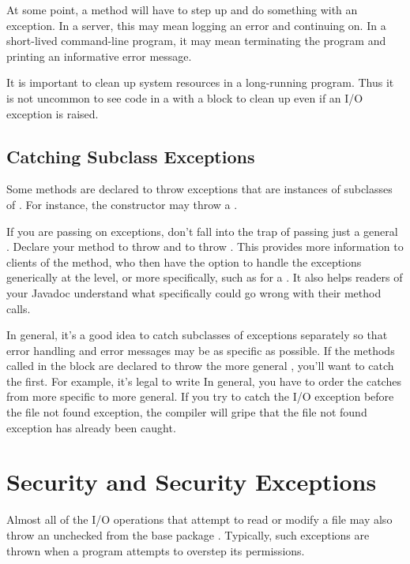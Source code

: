 At some point, a method will have to step up and do something with an
exception.  In a server, this may mean logging an error and continuing
on.  In a short-lived command-line program, it may mean terminating
the program and printing an informative error message.  

It is important to clean up system resources in a long-running
program.  Thus it is not uncommon to see code in a  with a
 block to clean up even if an I/O exception is raised.

\subsection{Catching Subclass Exceptions} 

Some methods are declared to throw exceptions that are instances
of subclasses of .  For instance, the constructor
 may throw a .

If you are passing on exceptions, don't fall into the trap of
passing just a general .  Declare your method
to throw  and to throw .
This provides more information to clients of the method, who then have
the option to handle the exceptions generically at the 
level, or more specifically, such as for a .
It also helps readers of your Javadoc understand what specifically could
go wrong with their method calls.

In general, it's a good idea to catch subclasses of exceptions
separately so that error handling and error messages may be as
specific as possible.  If the methods called in the  block
are declared to throw the more general , you'll want
to catch the  first.  For example, it's
legal to write
%
%
In general, you have to order the catches from more specific to more
general.  If you try to catch the I/O exception before the file not
found exception, the compiler will gripe that the file not found
exception has already been caught.



\section{Security and Security Exceptions}

Almost all of the I/O operations that attempt to read or modify a file
may also throw an unchecked  from the base
package . Typically, such exceptions are thrown when
a program attempts to overstep its permissions.

